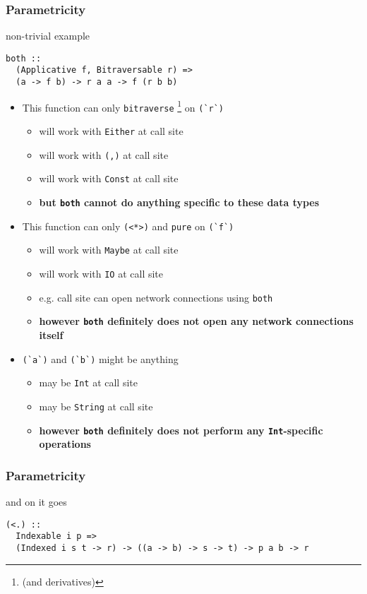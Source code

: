 \begin{frame}[fragile]
\frametitle{Parametricity}
\begin{block}{non-trivial example}
\begin{lstlisting}[style=haskell]
both ::
  (Applicative f, Bitraversable r) =>
  (a -> f b) -> r a a -> f (r b b)
\end{lstlisting}
\end{block}
\tiny
\begin{itemize}
  \item<1-> This function can only \lstinline{bitraverse} \footnote{(and derivatives)} on \lstinline{(`r`)}
  \begin{itemize}
    \item \tiny{will work with \lstinline{Either} at call site}
    \item \tiny{will work with \lstinline{(,)} at call site}
    \item \tiny{will work with \lstinline{Const} at call site}
    \item \tiny{\textbf{but \lstinline{both} cannot do anything specific to these data types}}
  \end{itemize}
  \item<2-> This function can only \lstinline{(<*>)} and \lstinline{pure} on \lstinline{(`f`)}
  \begin{itemize}
    \item \tiny{will work with \lstinline{Maybe} at call site}
    \item \tiny{will work with \lstinline{IO} at call site}
    \item \tiny{e.g. call site can open network connections using \lstinline{both}}
    \item \tiny{\textbf{however \lstinline{both} definitely does not open any network connections itself}}
  \end{itemize}
  \item<3-> \lstinline{(`a`)} and \lstinline{(`b`)} might be anything
  \begin{itemize}
    \item \tiny{may be \lstinline{Int} at call site}
    \item \tiny{may be \lstinline{String} at call site}
    \item \tiny{\textbf{however \lstinline{both} definitely does not perform any \lstinline{Int}-specific operations}}
  \end{itemize}
\end{itemize}
\end{frame}

\begin{frame}[fragile]
\frametitle{Parametricity}
\begin{block}{and on it goes}
\begin{lstlisting}[style=haskell]
(<.) ::
  Indexable i p =>
  (Indexed i s t -> r) -> ((a -> b) -> s -> t) -> p a b -> r
\end{lstlisting}
\end{block}
\end{frame}
